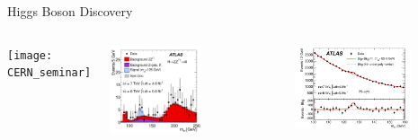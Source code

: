 \documentclass[11pt, xcolor={dvipsnames}, aspectratio=169]{beamer}
\begin{document}
\begin{frame}{Higgs Boson Discovery}

  \begin{columns}
    \centering

    \texttt{[image: CERN\_seminar]}

    \centering

    \includegraphics[width=0.55\textwidth]{higgs_discovery/fig_002}

    \includegraphics[width=0.7\textwidth]{higgs_discovery/figaux_004a}
  \end{columns}
\end{frame}

\end{document}
